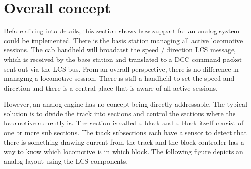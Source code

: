 \section{Overall concept}

Before diving into details, this section shows how support for an analog system could be implemented. There is the basis station managing all active locomotive sessions. The cab handheld will broadcast the speed / direction LCS message, which is received by the base station and translated to a DCC command packet sent out via the LCS bus. From an overall perspective, there is no difference in managing a locomotive session. There is still a handheld to set the speed and direction and there is a central place that is aware of all active sessions.

However, an analog engine has no concept being directly addressable. The typical solution is to divide the track into sections and control the sections where the locomotive currently is. The section is called a block and a block itself consist of one or more sub sections. The track subsections each have a sensor to detect that there is something drawing current from the track and the block controller has a way to know which locomotive is in which block. The following figure depicts an analog layout using the LCS components.

